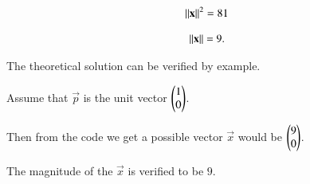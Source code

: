 \documentclass[journal]{IEEEtran}
\begin{document}
\begin{align}
\left\lVert\mathbf{x}\right\rVert^2 = 81
\end{align}

\begin{align}
\left\lVert\mathbf{x}\right\rVert = 9.
\end{align}

 The theoretical solution can be verified by example.
    
    \vfill
    
    Assume that $\vec{p}$ is the unit vector $\begin{pmatrix}1 \\ 0\end{pmatrix}$.
    
    \vfill

    Then from the code we get a possible vector $\vec{x}$ would be $\begin{pmatrix}9 \\ 0\end{pmatrix}$.
    
    \vfill
    
    The magnitude of the $\vec{x}$ is verified to be $9$.
\end{document}
